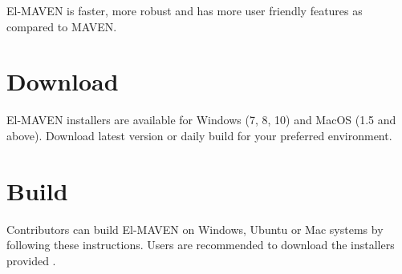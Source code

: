 \documentclass[letterpaper,10pt,english,openany,oneside]{sphinxmanual}
\begin{document}
El-MAVEN is faster, more robust and has more user friendly features as compared to MAVEN.


\section{Download}
\label{\detokenize{Download:download}}\label{\detokenize{Download::doc}}
El-MAVEN installers are available for Windows (7, 8, 10) and MacOS (1.5 and above). Download  latest version or daily build for your preferred environment.


\section{Build}
\label{\detokenize{Build:build}}\label{\detokenize{Build::doc}}
Contributors can build El-MAVEN on Windows, Ubuntu or Mac systems by following these instructions.
Users are recommended to download the installers provided .
\end{document}
